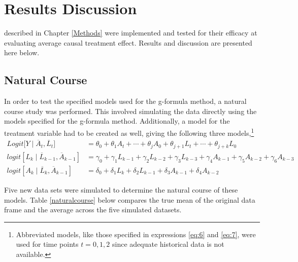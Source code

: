 
\chapter{Results Discussion} \label{Results}

 described in Chapter \ref{Methods} were implemented and tested for their efficacy at evaluating average causal treatment effect.  Results and discussion are presented here below.  

\section{Natural Course} 
In order to test the specified models used for the g-formula method, a natural course study was performed.  This involved simulating the data directly using the models specified for the g-formula method.  Additionally, a model for the treatment variable had to be created as well, giving the following three models,\footnote{Abbreviated models, like those specified in expressions \ref{eq:6} and \ref{eq:7}, were used for time points $t=0,1,2$ since adequate historical data is not available.} 
\begin{align} 
Logit \big[Y \mid \overline{A}_t, \overline{L}_t \big] &= \theta_{0} + \theta_1 A_{t} + \cdots + \theta_j A_0 + \theta_{j+1} L_t + \cdots + \theta_{j+k} L_0  \\ 
logit[L_k \mid \overline{L}_{k-1}, \overline{A}_{k-1}] &= \gamma_0 + \gamma_1 L_{k-1} + \gamma_2 L_{k-2} + \gamma_3 L_{k-3}  + \gamma_4 A_{k-1} + \gamma_5 A_{k-2} + \gamma_6 A_{k-3} \\ 
logit[A_k \mid \overline{L}_{k}, \overline{A}_{k-1}] &= \delta_0 + \delta_1 L_{k} + \delta_2 L_{k-1} + \delta_3 A_{k-1} + \delta_4 A_{k-2} 
\end{align} 

Five new data sets were simulated to determine the natural course of these models.  Table \ref{naturalcourse} below compares the true mean of the original data frame and the average across the five simulated datasets.  


